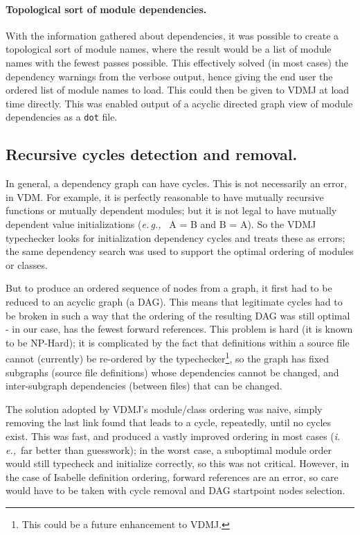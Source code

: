 \documentclass[runningheads,a4paper]{llncs}
\newcommand{\eg}{{\em e.\,g.,\/}}
\newcommand{\ie}{{\em i.\,e.,\/}}
\begin{document}
\paragraph*{Topological sort of module dependencies.}
%
With the information gathered about dependencies, it was possible to create a topological sort of module names, where the result would be a list of module names with the fewest passes possible. This effectively solved (in most cases) the dependency warnings from the verbose output, hence giving the end user the ordered list of module names to load. This could then be given to VDMJ at load time directly. This was enabled output of a acyclic directed graph view of module dependencies as a \texttt{dot} file.    

\subsection{Recursive cycles detection and removal.}

In general, a dependency graph can have cycles. This is not necessarily an error, in VDM. For example, it is perfectly reasonable to have mutually recursive functions or mutually dependent modules; but it is not legal to have mutually dependent value initializations (\eg~ A = B and B = A). So the VDMJ typechecker looks for initialization dependency cycles and treats these as errors; the same dependency search was used to support the optimal ordering of modules or classes.

But to produce an ordered sequence of nodes from a graph, it first had to be reduced to an acyclic graph (a DAG). This means that legitimate cycles had to be broken in such a way that the ordering of the resulting DAG was still optimal - in our case, has the fewest forward references. This problem is hard (it is known to be NP-Hard); it is complicated by the fact that definitions within a source file cannot (currently) be re-ordered by the typechecker\footnote{This could be a future enhancement to VDMJ.}, so the graph has fixed subgraphs (source file definitions) whose dependencies cannot be changed, and inter-subgraph dependencies (between files) that can be changed.

The solution adopted by VDMJ's module/class ordering was naive, simply removing the last link found that leads to a cycle, repeatedly, until no cycles exist. This was fast, and produced a vastly improved ordering in most cases (\ie~far better than guesswork); in the worst case, a suboptimal module order would still typecheck and initialize correctly, so this was not critical. However, in the case of Isabelle definition ordering, forward references are an error, so care would have to be taken with cycle removal and DAG startpoint nodes selection.
\end{document}
